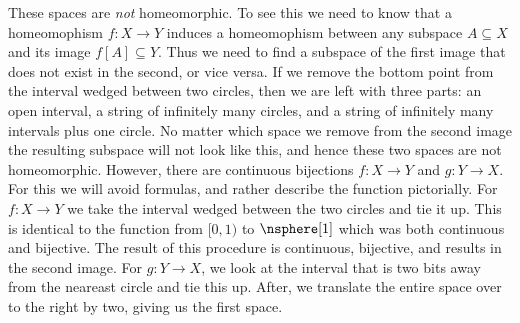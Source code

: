 \documentclass[oneside]{book}                                                  %
\begin{document}
                These spaces are \textit{not} homeomorphic. To see this we need
                to know that a homeomophism $f:X\rightarrow{Y}$ induces a
                homeomophism between any subspace $A\subseteq{X}$ and its image
                $f[A]\subseteq{Y}$. Thus we need to find a subspace of the first
                image that does not exist in the second, or vice versa. If we
                remove the bottom point from the interval wedged between two
                circles, then we are left with three parts: an open interval,
                a string of infinitely many circles, and a string of infinitely
                many intervals plus one circle. No matter which space we remove
                from the second image the resulting subspace will not look like
                this, and hence these two spaces are not homeomorphic. However,
                there are continuous bijections $f:X\rightarrow{Y}$ and
                $g:Y\rightarrow{X}$. For this we will avoid formulas, and rather
                describe the function pictorially. For $f:X\rightarrow{Y}$ we
                take the interval wedged between the two circles and tie it up.
                This is identical to the function from $[0,1)$ to $\nsphere[1]$
                which was both continuous and bijective. The result of this
                procedure is continuous, bijective, and results in the second
                image. For $g:Y\rightarrow{X}$, we look at the interval that is
                two bits away from the neareast circle and tie this up. After,
                we translate the entire space over to the right by two, giving
                us the first space.
\end{document}
